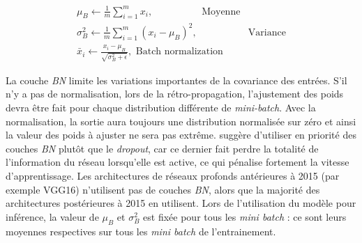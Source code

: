 \begin{equation} \label{eq:batch_norm}
\begin{split}
\mu_{B} \leftarrow \frac{1}{m} \sum_{i=1}^{m} x_{i} , \quad \quad \quad \quad \ \ \ \text{ Moyenne}
\\
\sigma_{B}^{2} \leftarrow \frac{1}{m} \sum_{i=1}^{m}\left(x_{i}-\mu_{B}\right)^{2} , \quad \quad \quad \quad \ \ \ \ \text{  Variance}
\\
\bar{x}_{i} \leftarrow \frac{x_{i}-\mu_{B}}{\sqrt{\sigma_{B}^{2}+\epsilon}} , \text{ Batch normalization} \ 
\end{split}
\end{equation}

La couche \textit{BN} limite les variations importantes de la covariance des entrées. S'il n'y a pas de normalisation, lors de la rétro-propagation, l'ajustement des poids devra être fait pour chaque distribution différente de \textit{mini-batch}.
Avec la normalisation, la sortie aura toujours une distribution normalisée sur zéro et ainsi la valeur des poids à ajuster ne sera pas extrême.
\citeauthor{ioffe_batch_2015} \cite{ioffe_batch_2015} suggère d'utiliser en priorité des couches \textit{BN} plutôt que le \textit{dropout}, car ce dernier fait perdre la totalité de l'information du réseau lorsqu'elle est active, ce qui pénalise fortement la vitesse d'apprentissage.
Les architectures de réseaux profonds antérieures à 2015 (par exemple VGG16) n'utilisent pas de couches \textit{BN}, alors que la majorité des architectures postérieures à 2015 en utilisent.
Lors de l'utilisation du modèle pour inférence, la valeur de $\mu_{B}$ et $\sigma_B^2$ est fixée pour tous les \textit{mini batch} : ce sont leurs moyennes respectives sur tous les \textit{mini batch} de l'entrainement.

